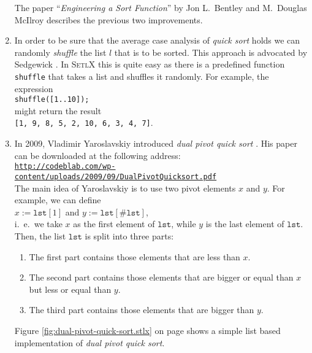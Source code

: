 \begin{enumerate}
      The paper ``\emph{Engineering a Sort Function}'' by Jon L.~Bentley and M.~Douglas McIlroy
      \cite{bentley:93} describes the previous two improvements.
\item In order to be sure that the average case analysis of \emph{quick sort} holds we can randomly
      \emph{shuffle} the list $l$ that is to be sorted.  This approach is advocated by Sedgewick
      \cite{sedgewick:2011}.  In \textsc{SetlX} this is quite easy as
      there is a predefined function \texttt{shuffle} that takes a list and shuffles it randomly.
      For example, the expression
      \\[0.2cm]
      \hspace*{1.3cm}
      \texttt{shuffle([1..10]);}
      \\[0.2cm]
      might return the result
      \\[0.2cm]
      \hspace*{1.3cm}
      \texttt{[1, 9, 8, 5, 2, 10, 6, 3, 4, 7]}.
\item In 2009, Vladimir Yaroslavskiy introduced \emph{dual pivot quick sort} \cite{yaroslavskiy:2009}.  His paper can be
      downloaded at the following address:
      \\[0.2cm]
      \hspace*{0.3cm}
      \href{http://codeblab.com/wp-content/uploads/2009/09/DualPivotQuicksort.pdf}{\texttt{http://codeblab.com/wp-content/uploads/2009/09/DualPivotQuicksort.pdf}}
      \\[0.2cm]
      The main idea of Yaroslavskiy is to use two pivot elements $x$ and $y$.  For example, we can
      define
      \\[0.2cm]
      \hspace*{1.3cm}
      $x := \mathtt{lst}[1]$ \quad and \quad $y := \mathtt{lst}[\#\mathtt{lst}]$,
      \\[0.2cm]
      i.~e.~we take $x$ as the first element of $\mathtt{lst}$, while $y$ is the last element of
      $\mathtt{lst}$.  Then, the list 
      $\mathtt{lst}$ is split into three parts:
      \begin{enumerate}
      \item The first part contains those elements that are less than $x$.
      \item The second part contains those elements that are bigger or equal than $x$ but less or
            equal than $y$.
      \item The third part contains those elements that are bigger than $y$.
      \end{enumerate}
      Figure \ref{fig:dual-pivot-quick-sort.stlx} on page \pageref{fig:dual-pivot-quick-sort.stlx}
      shows a simple list based implementation of \emph{dual pivot quick sort}.




\end{enumerate}
